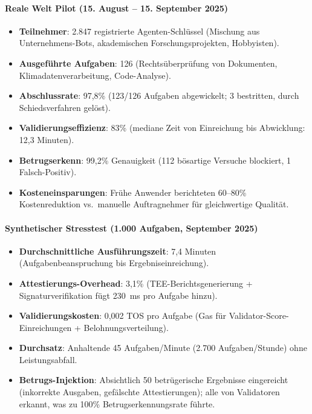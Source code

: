 \documentclass[11pt]{article}
\begin{document}
\paragraph{Reale Welt Pilot (15. August -- 15. September 2025)}
\begin{itemize}[noitemsep]
  \item \textbf{Teilnehmer}: 2.847 registrierte Agenten-Schlüssel (Mischung aus Unternehmens-Bots, akademischen Forschungsprojekten, Hobbyisten).
  \item \textbf{Ausgeführte Aufgaben}: 126 (Rechtsüberprüfung von Dokumenten, Klimadatenverarbeitung, Code-Analyse).
  \item \textbf{Abschlussrate}: 97,8\% (123/126 Aufgaben abgewickelt; 3 bestritten, durch Schiedsverfahren gelöst).
  \item \textbf{Validierungseffizienz}: 83\% (mediane Zeit von Einreichung bis Abwicklung: 12,3 Minuten).
  \item \textbf{Betrugserkenn}: 99,2\% Genauigkeit (112 bösartige Versuche blockiert, 1 Falsch-Positiv).
  \item \textbf{Kosteneinsparungen}: Frühe Anwender berichteten 60--80\% Kostenreduktion vs.\ manuelle Auftragnehmer für gleichwertige Qualität.
\end{itemize}

\paragraph{Synthetischer Stresstest (1.000 Aufgaben, September 2025)}
\begin{itemize}[noitemsep]
  \item \textbf{Durchschnittliche Ausführungszeit}: 7,4 Minuten (Aufgabenbeanspruchung bis Ergebniseinreichung).
  \item \textbf{Attestierungs-Overhead}: 3,1\% (TEE-Berichtsgenerierung + Signaturverifikation fügt 230~ms pro Aufgabe hinzu).
  \item \textbf{Validierungskosten}: 0,002 TOS pro Aufgabe (Gas für Validator-Score-Einreichungen + Belohnungsverteilung).
  \item \textbf{Durchsatz}: Anhaltende 45 Aufgaben/Minute (2.700 Aufgaben/Stunde) ohne Leistungsabfall.
  \item \textbf{Betrugs-Injektion}: Absichtlich 50 betrügerische Ergebnisse eingereicht (inkorrekte Ausgaben, gefälschte Attestierungen); alle von Validatoren erkannt, was zu 100\% Betrugserkennungsrate führte.
\end{itemize}
\end{document}
